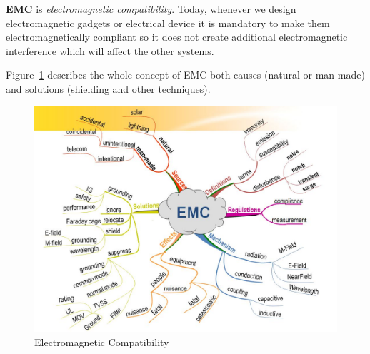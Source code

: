 \textbf{EMC} is \textit{electromagnetic compatibility}. Today, whenever we design electromagnetic gadgets or electrical device it is mandatory to make them electromagnetically compliant so it does not create additional electromagnetic interference which will affect the other systems.

Figure~\ref{fig:634771461726914062} describes the whole concept of EMC both causes (natural or man-made) and solutions (shielding and other techniques).
\begin{figure}[h]
\centering
\includegraphics[scale=0.35]{./graphics/634771461726914062}
\caption{Electromagnetic Compatibility}
\label{fig:634771461726914062}
\end{figure}
